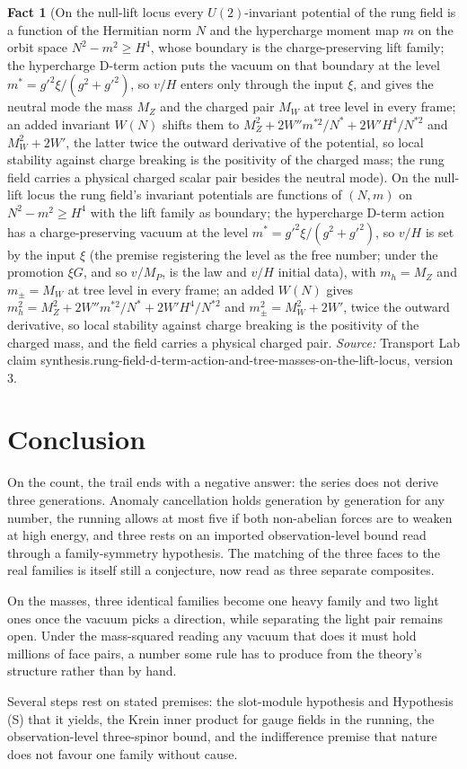 \documentclass[11pt]{article}
\theoremstyle{definition}
\newtheorem{fact}[theorem]{Fact}
\theoremstyle{plain}
\begin{document}
\begin{fact}[On the null-lift locus every $U(2)$-invariant potential of the rung field is a function of the Hermitian norm $N$ and the hypercharge moment map $m$ on the orbit space $N^{2} - m^{2} \ge H^{4}$, whose boundary is the charge-preserving lift family; the hypercharge D-term action puts the vacuum on that boundary at the level $m^{*} = g'^{2}\xi/(g^{2} + g'^{2})$, so $v/H$ enters only through the input $\xi$, and gives the neutral mode the mass $M_{Z}$ and the charged pair $M_{W}$ at tree level in every frame; an added invariant $W(N)$ shifts them to $M_{Z}^{2} + 2W''m^{*2}/N^{*} + 2W'H^{4}/N^{*2}$ and $M_{W}^{2} + 2W'$, the latter twice the outward derivative of the potential, so local stability against charge breaking is the positivity of the charged mass; the rung field carries a physical charged scalar pair besides the neutral mode]\label{c:synthesis.rung-field-d-term-action-and-tree-masses-on-the-lift-locus}
On the null-lift locus the rung field's invariant potentials are functions of $(N, m)$ on $N^{2} - m^{2} \ge H^{4}$ with the lift family as boundary; the hypercharge D-term action has a charge-preserving vacuum at the level $m^{*} = g'^{2}\xi/(g^{2} + g'^{2})$, so $v/H$ is set by the input $\xi$ (the premise registering the level as the free number; under the promotion $\xi G$, and so $v/M_{P}$, is the law and $v/H$ initial data), with $m_{h} = M_{Z}$ and $m_{\pm} = M_{W}$ at tree level in every frame; an added $W(N)$ gives $m_{h}^{2} = M_{Z}^{2} + 2W''m^{*2}/N^{*} + 2W'H^{4}/N^{*2}$ and $m_{\pm}^{2} = M_{W}^{2} + 2W'$, twice the outward derivative, so local stability against charge breaking is the positivity of the charged mass, and the field carries a physical charged pair.
\emph{Source:} Transport Lab claim synthesis.rung-field-d-term-action-and-tree-masses-on-the-lift-locus, version 3.
\end{fact}

\section*{Conclusion}
On the count, the trail ends with a negative answer: the series does not derive three generations. Anomaly cancellation holds generation by generation for any number, the running allows at most five if both non-abelian forces are to weaken at high energy, and three rests on an imported observation-level bound read through a family-symmetry hypothesis. The matching of the three faces to the real families is itself still a conjecture, now read as three separate composites.

On the masses, three identical families become one heavy family and two light ones once the vacuum picks a direction, while separating the light pair remains open. Under the mass-squared reading any vacuum that does it must hold millions of face pairs, a number some rule has to produce from the theory's structure rather than by hand.

Several steps rest on stated premises: the slot-module hypothesis and Hypothesis (S) that it yields, the Krein inner product for gauge fields in the running, the observation-level three-spinor bound, and the indifference premise that nature does not favour one family without cause.
\end{document}
